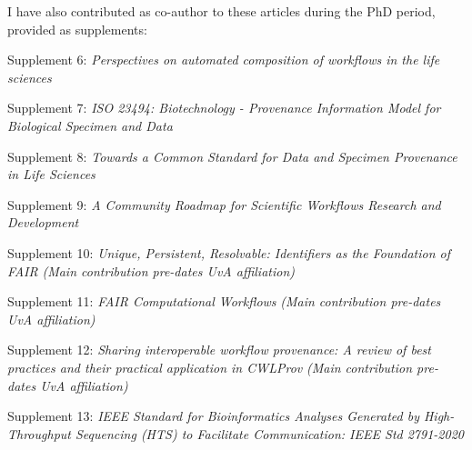 I have also contributed as co-author to these articles during the PhD
period, provided as supplements:

 \cite{ch6-37}

 \cite{De Geest 2022}

 \cite{Goble 2021}

 \cite{Crusoe 2022}

 \cite{Kuhn 2021}

Supplement 6: \emph{Perspectives on automated composition of workflows in the life sciences} \cite{lamprechtPerspectivesAutomatedComposition2021b}

Supplement 7: \emph{ISO 23494: Biotechnology - Provenance Information Model for Biological
Specimen and Data} \cite{Wittner 2020}

Supplement 8: \emph{Towards a Common Standard for Data and Specimen Provenance in Life Sciences} \cite{Wittner 2023}

Supplement 9: \emph{A Community Roadmap for Scientific Workflows Research and Development} \cite{ch6-39}

Supplement 10: \emph{Unique, Persistent, Resolvable: Identifiers as the Foundation of FAIR} \cite{Juty 2020} 
\emph{(Main contribution pre-dates UvA affiliation)} 

Supplement 11: \emph{FAIR Computational Workflows} \cite{Goble 2020} \emph{(Main contribution pre-dates UvA
affiliation)} 

Supplement 12: \emph{Sharing interoperable workflow provenance: A review of best practices and their practical application in CWLProv} \cite{ch5-68} \emph{(Main contribution pre-dates UvA
affiliation)} 

Supplement 13: \emph{IEEE Standard for Bioinformatics Analyses Generated by High-Throughput Sequencing (HTS) to Facilitate Communication: IEEE Std 2791-2020} \cite{ch5-64}

